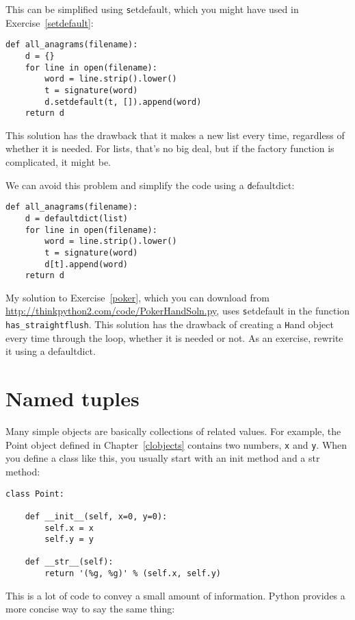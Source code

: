 \documentclass[
DIV=11,
fontsize=12,
twoside,
headinclude=false,
titlepage=firstiscover,
abstract=true,
headsepline=true,
footsepline=true,
chapterprefix=true, %
headings=big,
bibliography=totoc,%
captions=tableheading
]{scrbook}
\theoremstyle{definition}
\begin{document}
This can be simplified using {\texttt setdefault}, which you might
have used in Exercise~\ref{setdefault}:

\begin{lstlisting}
def all_anagrams(filename):
    d = {}
    for line in open(filename):
        word = line.strip().lower()
        t = signature(word)
        d.setdefault(t, []).append(word)
    return d
\end{lstlisting}

This solution has the drawback that it makes a new list
every time, regardless of whether it is needed.  For lists,
that's no big deal, but if the factory
function is complicated, it might be.

We can avoid this problem and 
simplify the code using a {\texttt defaultdict}:

\begin{lstlisting}
def all_anagrams(filename):
    d = defaultdict(list)
    for line in open(filename):
        word = line.strip().lower()
        t = signature(word)
        d[t].append(word)
    return d
\end{lstlisting}

My solution to Exercise~\ref{poker}, which you can download from
\url{http://thinkpython2.com/code/PokerHandSoln.py},
uses {\texttt setdefault} in the function
\verb"has_straightflush".  This solution has the drawback
of creating a {\texttt Hand} object every time through the loop, whether
it is needed or not.  As an exercise, rewrite it using
a defaultdict.


\section{Named tuples}

Many simple objects are basically collections of related values.
For example, the Point object defined in Chapter~\ref{clobjects} contains
two numbers, {\texttt x} and {\texttt y}.  When you define a class like
this, you usually start with an init method and a str method:

\begin{lstlisting}
class Point:

    def __init__(self, x=0, y=0):
        self.x = x
        self.y = y

    def __str__(self):
        return '(%g, %g)' % (self.x, self.y)
\end{lstlisting}

This is a lot of code to convey a small amount of information.
Python provides a more concise way to say the same thing:
\end{document}
